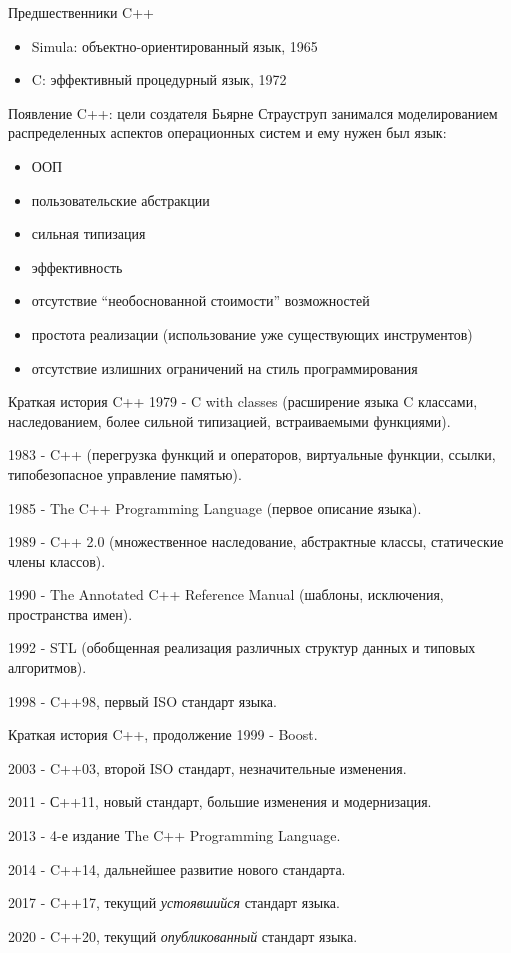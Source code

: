 \documentclass[unknownkeysallowed,xcolor=table]{beamer}
\begin{document}
\begin{frame}{Предшественники C++}
  \begin{itemize}
    \item Simula: объектно-ориентированный язык, 1965 \vspace{3em}
    \item C: эффективный процедурный язык, 1972
  \end{itemize}
\end{frame}

\begin{frame}{Появление C++: цели создателя}
  Бьярне Страуструп занимался моделированием распределенных аспектов операционных систем и ему нужен был язык:
  \begin{itemize}
    \item ООП
    \item пользовательские абстракции
    \item сильная типизация
    \item эффективность
    \item отсутствие ``необоснованной стоимости'' возможностей
    \item простота реализации (использование уже существующих инструментов)
    \item отсутствие излишних ограничений на стиль программирования
  \end{itemize}
\end{frame}

\begin{frame}{Краткая история C++}
  1979 - C with classes (расширение языка C классами, наследованием, более сильной типизацией, встраиваемыми функциями).

  1983 - C++ (перегрузка функций и операторов, виртуальные функции, ссылки, типобезопасное управление памятью).

  1985 - The C++ Programming Language (первое описание языка).

  1989 - C++ 2.0 (множественное наследование, абстрактные классы, статические члены классов).

  1990 - The Annotated C++ Reference Manual (шаблоны, исключения, пространства имен).

  1992 - STL (обобщенная реализация различных структур данных и типовых алгоритмов).

  1998 - C++98, первый ISO стандарт языка.
\end{frame}

\begin{frame}{Краткая история C++, продолжение}
  1999 - Boost.

  2003 - C++03, второй ISO стандарт, незначительные изменения.

  2011 - С++11, новый стандарт, большие изменения и модернизация.

  2013 - 4-е издание The C++ Programming Language.

  2014 - C++14, дальнейшее развитие нового стандарта.

  2017 - C++17, текущий \emph{устоявшийся} стандарт языка.

  2020 - C++20, текущий \emph{опубликованный} стандарт языка.
\end{frame}
\end{document}
